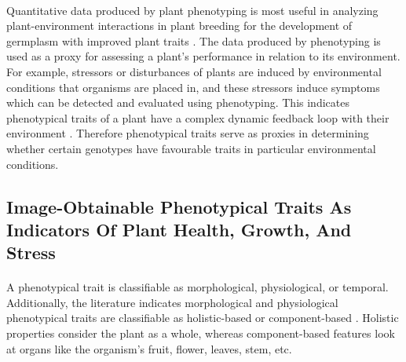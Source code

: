 \paragraph{}
Quantitative data produced by plant phenotyping is most useful in analyzing plant-environment interactions in plant breeding \cite{fioraniFutureScenariosPlant2013} for the development of germplasm with improved plant traits \cite{liReviewImagingTechniques2014}. The data produced by phenotyping is used as a proxy for assessing a plant's performance in relation to its environment. For example, stressors or disturbances of plants are induced by environmental conditions that organisms are placed in, and these stressors induce symptoms which can be detected and evaluated using phenotyping. This indicates phenotypical traits of a plant have a complex dynamic feedback loop with their environment \cite{walterPlantPhenotypingBean2015}. Therefore phenotypical traits serve as proxies in determining whether certain genotypes have favourable traits in particular environmental conditions.

\subsection{Image-Obtainable Phenotypical Traits As Indicators Of Plant Health, Growth, And Stress}

\paragraph{}
A phenotypical trait is classifiable as morphological, physiological, or temporal. Additionally, the literature indicates morphological and physiological phenotypical traits are classifiable as holistic-based or component-based \cite{daschoudhuryLeveragingImageAnalysis2019}. Holistic properties consider the plant as a whole, whereas component-based features look at organs like the organism's fruit, flower, leaves, stem, etc. 

